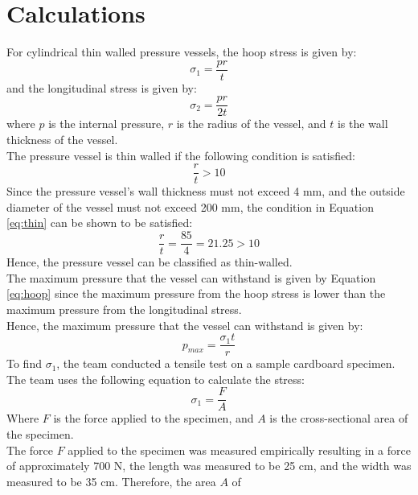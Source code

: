 \documentclass[12pt, titlepage]{article}
\begin{document}
\section{Calculations}
For cylindrical thin walled pressure vessels, the hoop stress is given by:
\begin{equation}
    \sigma_1 = \frac{pr}{t}
    \label{eq:hoop}
\end{equation}
and the longitudinal stress is given by:
\begin{equation}
    \sigma_2 = \frac{pr}{2t}
    \label{eq:long}
\end{equation}
where $p$ is the internal pressure, $r$ is the radius of the vessel, and $t$ is
the wall thickness of the vessel.\\[10pt]
The pressure vessel is thin walled if the following condition is satisfied:
\begin{equation}
    \frac{r}{t} > 10
    \label{eq:thin}
\end{equation}
Since the pressure vessel's wall thickness must not exceed 4 mm, and the 
outside diameter of the vessel must not exceed 200 mm, the condition in
Equation \ref{eq:thin} can be shown to be satisfied:
\begin{equation}
    \frac{r}{t} = \frac{85}{4} = 21.25 > 10
    \label{eq:check_thin}
\end{equation}
Hence, the pressure vessel can be classified as thin-walled.\\[10pt]
The maximum pressure that the vessel can withstand is given by Equation
\ref{eq:hoop} since the maximum pressure from the hoop stress is lower than the
maximum pressure from the longitudinal stress.\\[10pt]
Hence, the maximum pressure that the vessel can withstand is given by:
\begin{equation}
    p_{max} = \frac{\sigma_1 t}{r}
    \label{eq:max_pressure}
\end{equation}
To find $\sigma_1$, the team conducted a tensile test on a sample
cardboard specimen. The team uses the following equation to calculate the
stress:
\begin{equation}
    \sigma_1 = \frac{F}{A}
    \label{eq:stress}
\end{equation}
Where $F$ is the force applied to the specimen, and $A$ is the cross-sectional
area of the specimen.\\[10pt]
The force $F$ applied to the specimen was measured empirically
resulting in a force of approximately 700 N, the length was measured
to be 25 cm, and the width was measured to be 35 cm. Therefore, the area $A$ of
\end{document}
